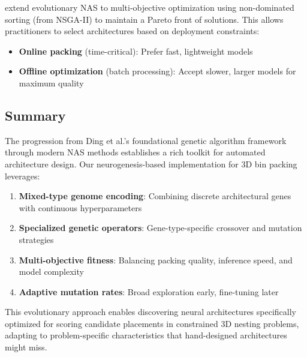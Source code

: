 \citet{Booysen2024} extend evolutionary NAS to multi-objective optimization using non-dominated sorting (from NSGA-II) to maintain a Pareto front of solutions. This allows practitioners to select architectures based on deployment constraints:
\begin{itemize}
    \item \textbf{Online packing} (time-critical): Prefer fast, lightweight models
    \item \textbf{Offline optimization} (batch processing): Accept slower, larger models for maximum quality
\end{itemize}

\subsection{Summary}

The progression from Ding et al.'s foundational genetic algorithm framework through modern NAS methods establishes a rich toolkit for automated architecture design. Our neurogenesis-based implementation for 3D bin packing leverages:

\begin{enumerate}
    \item \textbf{Mixed-type genome encoding}: Combining discrete architectural genes with continuous hyperparameters
    \item \textbf{Specialized genetic operators}: Gene-type-specific crossover and mutation strategies
    \item \textbf{Multi-objective fitness}: Balancing packing quality, inference speed, and model complexity
    \item \textbf{Adaptive mutation rates}: Broad exploration early, fine-tuning later
\end{enumerate}

This evolutionary approach enables discovering neural architectures specifically optimized for scoring candidate placements in constrained 3D nesting problems, adapting to problem-specific characteristics that hand-designed architectures might miss.
